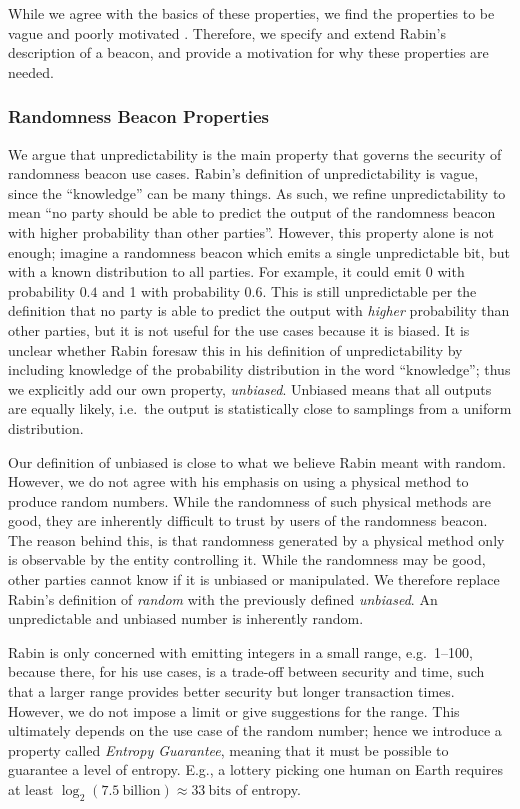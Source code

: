 While we agree with the basics of these properties, we find the properties to be vague and poorly motivated .
Therefore, we specify and extend Rabin's description of a beacon, and provide a motivation for why these properties are needed.

\subsubsection{Randomness Beacon Properties}
We argue that unpredictability is the main property that governs the security of randomness beacon use cases.
Rabin's definition of unpredictability is vague, since the \enquote{knowledge} can be many things.
As such, we refine unpredictability to mean \enquote{no party should be able to predict the output of the randomness beacon with higher probability than other parties}.
However, this property alone is not enough; imagine a randomness beacon which emits a single unpredictable bit, but with a known distribution to all parties.
For example, it could emit 0 with probability $0.4$ and 1 with probability $0.6$.
This is still unpredictable per the definition that no party is able to predict the output with \emph{higher} probability than other parties, but it is not useful for the use cases because it is biased.
It is unclear whether Rabin foresaw this in his definition of unpredictability by including knowledge of the probability distribution in the word \enquote{knowledge}; thus we explicitly add our own property, \emph{unbiased}.
Unbiased means that all outputs are equally likely, i.e.\ the output is statistically close to samplings from a uniform distribution.

Our definition of unbiased is close to what we believe Rabin meant with random.
However, we do not agree with his emphasis on using a physical method to produce random numbers.
While the randomness of such physical methods are good, they are inherently difficult to trust by users of the randomness beacon.
The reason behind this, is that randomness generated by a physical method only is observable by the entity controlling it.
While the randomness may be good, other parties cannot know if it is unbiased or manipulated.
We therefore replace Rabin's definition of \emph{random} with the previously defined \emph{unbiased}.
An unpredictable and unbiased number is inherently random.

Rabin is only concerned with emitting integers in a small range, e.g.\ 1--100, because there, for his use cases, is a trade-off between security and time, such that a larger range provides better security but longer transaction times.
However, we do not impose a limit or give suggestions for the range.
This ultimately depends on the use case of the random number;
hence we introduce a property called \emph{Entropy Guarantee}, meaning that it must be possible to guarantee a level of entropy.
E.g., a lottery picking one human on Earth requires at least $\log_2(7.5~\text{billion}) \approx 33~\text{bits}$ of entropy.

